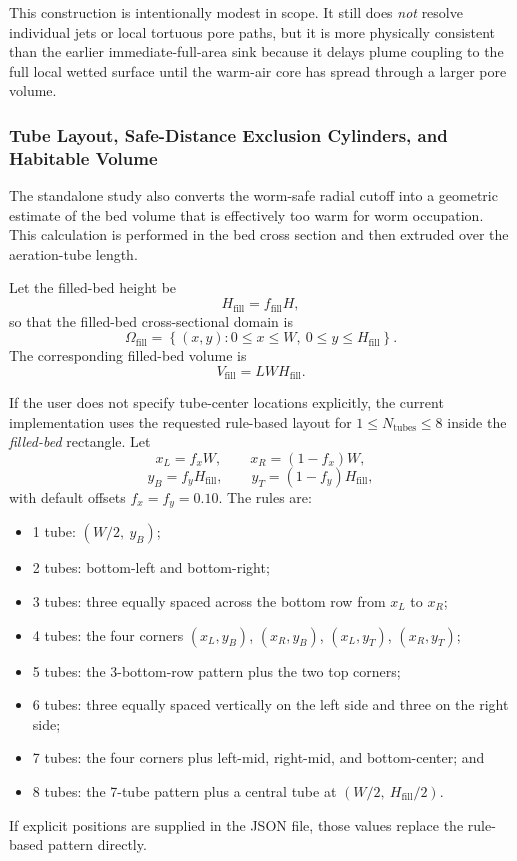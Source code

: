 \documentclass{article}
\begin{document}
This construction is intentionally modest in scope. It still does
\emph{not} resolve individual jets or local tortuous pore paths, but it is
more physically consistent than the earlier immediate-full-area sink because
it delays plume coupling to the full local wetted surface until the warm-air
core has spread through a larger pore volume.

\subsubsection{Tube Layout, Safe-Distance Exclusion Cylinders, and Habitable Volume}

The standalone study also converts the worm-safe radial cutoff into a
geometric estimate of the bed volume that is effectively too warm for worm
occupation. This calculation is performed in the bed cross section and then
extruded over the aeration-tube length.

Let the filled-bed height be
\begin{equation}
H_{\mathrm{fill}} = f_{\mathrm{fill}} H,
\end{equation}
so that the filled-bed cross-sectional domain is
\begin{equation}
\Omega_{\mathrm{fill}}
=
\left\{(x,y): 0 \le x \le W,\ 0 \le y \le H_{\mathrm{fill}}\right\}.
\end{equation}
The corresponding filled-bed volume is
\begin{equation}
V_{\mathrm{fill}} = L W H_{\mathrm{fill}}.
\end{equation}

If the user does not specify tube-center locations explicitly, the current
implementation uses the requested rule-based layout for $1 \le
N_{\mathrm{tubes}} \le 8$ inside the \emph{filled-bed} rectangle. Let
\begin{equation}
x_L = f_x W, \qquad x_R = (1-f_x)W,
\end{equation}
\begin{equation}
y_B = f_y H_{\mathrm{fill}}, \qquad y_T = (1-f_y)H_{\mathrm{fill}},
\end{equation}
with default offsets $f_x=f_y=0.10$. The rules are:
\begin{itemize}
\item 1 tube: $(W/2,\ y_B)$;
\item 2 tubes: bottom-left and bottom-right;
\item 3 tubes: three equally spaced across the bottom row from $x_L$ to $x_R$;
\item 4 tubes: the four corners $(x_L,y_B)$, $(x_R,y_B)$, $(x_L,y_T)$, $(x_R,y_T)$;
\item 5 tubes: the 3-bottom-row pattern plus the two top corners;
\item 6 tubes: three equally spaced vertically on the left side and three on the right side;
\item 7 tubes: the four corners plus left-mid, right-mid, and bottom-center; and
\item 8 tubes: the 7-tube pattern plus a central tube at $(W/2,\ H_{\mathrm{fill}}/2)$.
\end{itemize}
If explicit positions are supplied in the JSON file, those values replace the
rule-based pattern directly.
\end{document}
